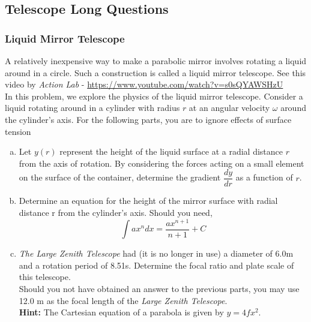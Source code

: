 \documentclass[a4paper,12pt]{extarticle}
\begin{document}
\clearpage
\subsection{Telescope Long Questions}

\subsubsection{Liquid Mirror Telescope}

A relatively inexpensive way to make a parabolic mirror involves rotating a liquid around in a circle.
Such a construction is called a liquid mirror telescope. See this video by \textit{Action Lab} - \url{https://www.youtube.com/watch?v=s0sQYAWSHzU}\\

In this problem, we explore the physics of the liquid mirror telescope. Consider a liquid rotating around in a cylinder with radius $r$ at an angular velocity $\omega$ around the cylinder’s axis. For the following parts, you are to ignore effects of surface tension
\begin{enumerate}[a.]
	\item Let $y(r)$ represent the height of the liquid surface at a radial distance $r$ from the axis of rotation. By considering the forces acting on a small element on the surface of the container, determine the gradient $\dfrac{dy}{dr}$ as a function of $r$.
	\item Determine an equation for the height of the mirror surface with radial distance r from the cylinder's axis. Should you need, $$\int ax^n dx=\frac{ax^{n+1}}{n+1}+C$$
	\item \textit{The Large Zenith Telescope} had (it is no longer in use) a diameter of $6.0$m and a rotation period of 8.51s. Determine the focal ratio and plate scale of this telescope.\\
	Should you not have obtained an answer to the previous parts, you may use 12.0 m as the focal
	length of the \textit{Large Zenith Telescope}.\\
	\textbf{Hint:} The Cartesian equation of a parabola is given by $y = 4fx^2$.
\end{enumerate}
\end{document}
